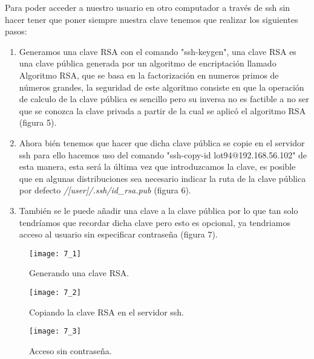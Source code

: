 \documentclass[a4paper, 11pt]{article} %
\begin{document}
Para poder acceder a nuestro usuario en otro computador a través de ssh sin hacer tener que poner siempre nuestra clave tenemos que realizar los siguientes pasos:
\begin{enumerate}
\item Generamos una clave RSA con el comando "ssh-keygen", una clave RSA es una clave pública generada por un algoritmo de encriptación llamado Algoritmo RSA, que se basa en la factorización en numeros primos de números grandes, la seguridad de este algoritmo consiste en que la operación de calculo de la clave pública es sencillo pero su inversa no es factible a no ser que se conozca la clave privada a partir de la cual se aplicó el algoritmo RSA (figura 5).
\item Ahora bién tenemos que hacer que dicha clave pública se copie en el servidor ssh para ello hacemos uso del comando "ssh-copy-id lot94@192.168.56.102" de esta manera, esta será la última vez que introduzcamos la clave, es posible que en algunas distribuciones sea necesario indicar la ruta de la clave pública por defecto \textit{/[user]/.ssh/id\_rsa.pub} (figura 6).
\item También se le puede añadir una clave a la clave pública por lo que tan solo tendríamos que recordar dicha clave pero esto es opcional, ya tendriamos acceso al usuario sin especificar contraseña (figura 7).
\end{enumerate}
\begin{figure}[h]
\centering 
\texttt{[image: 7\_1]} 
\caption{Generando una clave RSA.} 
\vspace{-0.5cm}
\label{contexto:figura} 
\end{figure}
\begin{figure}[h]
\centering 
\texttt{[image: 7\_2]} 
\caption{Copiando la clave RSA en el servidor ssh.} 
\vspace{-0.5cm}
\label{contexto:figura} 
\end{figure}
\begin{figure}[h]
\centering 
\texttt{[image: 7\_3]} 
\caption{Acceso sin contraseña.} 
\vspace{-0.5cm}
\label{contexto:figura} 
\end{figure}
\end{document}
